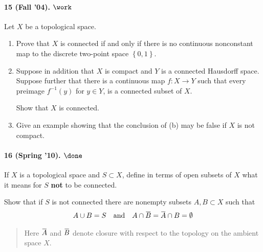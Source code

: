 \hypertarget{fall-04.-work}{%
\paragraph{\texorpdfstring{15 (Fall '04).
\(\work\)}{15 (Fall '04). \textbackslash work}}\label{fall-04.-work}}

Let \(X\) be a topological space.

\begin{enumerate}
\def\labelenumi{\alph{enumi}.}
\item
  Prove that \(X\) is connected if and only if there is no continuous
  nonconstant map to the discrete two-point space
  \(\left\{{0, 1}\right\}\).
\item
  Suppose in addition that \(X\) is compact and \(Y\) is a connected
  Hausdorff space. Suppose further that there is a continuous map
  \(f : X \to Y\) such that every preimage \(f^{-1}(y)\) for
  \(y \in Y\), is a connected subset of \(X\).

  Show that \(X\) is connected.
\item
  Give an example showing that the conclusion of (b) may be false if
  \(X\) is not compact.
\end{enumerate}

\hypertarget{spring-10.-done}{%
\paragraph{\texorpdfstring{16 (Spring '10).
\(\done\)}{16 (Spring '10). \textbackslash done}}\label{spring-10.-done}}

If \(X\) is a topological space and \(S \subset X\), define in terms of
open subsets of \(X\) what it means for \(S\) \textbf{not} to be
connected.

Show that if \(S\) is not connected there are nonempty subsets
\(A, B \subset X\) such that
\begin{align*}
A \cup B = S {\quad \operatorname{and} \quad} A \cap \mkern 1.5mu\overline{\mkern-1.5muB\mkern-1.5mu}\mkern 1.5mu = \mkern 1.5mu\overline{\mkern-1.5muA\mkern-1.5mu}\mkern 1.5mu \cap B = \emptyset
\end{align*}

\begin{quote}
Here \(\mkern 1.5mu\overline{\mkern-1.5muA\mkern-1.5mu}\mkern 1.5mu\)
and \(\mkern 1.5mu\overline{\mkern-1.5muB\mkern-1.5mu}\mkern 1.5mu\)
denote closure with respect to the topology on the ambient space \(X\).
\end{quote}

